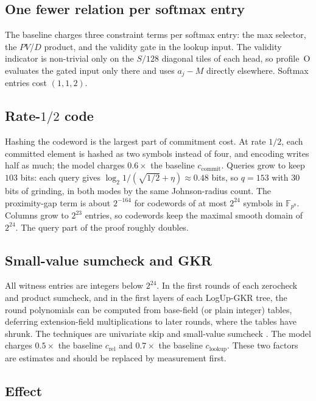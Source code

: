 \documentclass[11pt]{article}
\newcommand{\F}{\mathbb{F}}
\newcommand{\Fo}{\F_{p^8}}
\begin{document}
\subsection{One fewer relation per softmax entry}

The baseline charges three constraint terms per softmax entry: the max selector, the \(PV\)/\(D\) product, and the validity gate in the lookup input.
The validity indicator is non-trivial only on the \(S/128\) diagonal tiles of each head, so profile~O evaluates the gated input only there and uses \(a_j - M\) directly elsewhere.
Softmax entries cost \((1,1,2)\).

\subsection{Rate-\texorpdfstring{\(1/2\)}{1/2} code}
\label{sec:opt-rate}

Hashing the codeword is the largest part of commitment cost.
At rate \(1/2\), each committed element is hashed as two symbols instead of four, and encoding writes half as much; the model charges \(0.6\times\) the baseline \(c_{\mathrm{commit}}\).
Queries grow to keep \(103\) bits: each query gives \(\log_2 1/(\sqrt{1/2} + \eta) \approx 0.48\) bits, so \(q = 153\) with \(30\) bits of grinding, in both modes by the same Johnson-radius count.
The proximity-gap term is about \(2^{-164}\) for codewords of at most \(2^{24}\) symbols in \(\Fo\).
Columns grow to \(2^{23}\) entries, so codewords keep the maximal smooth domain of \(2^{24}\).
The query part of the proof roughly doubles.

\subsection{Small-value sumcheck and GKR}

All witness entries are integers below \(2^{24}\).
In the first rounds of each zerocheck and product sumcheck, and in the first layers of each LogUp-GKR tree, the round polynomials can be computed from base-field (or plain integer) tables, deferring extension-field multiplications to later rounds, where the tables have shrunk.
The techniques are univariate skip and small-value sumcheck \cite{gruen,smallsc}.
The model charges \(0.5\times\) the baseline \(c_{\mathrm{rel}}\) and \(0.7\times\) the baseline \(c_{\mathrm{lookup}}\).
These two factors are estimates and should be replaced by measurement first.

\subsection{Effect}
\end{document}
